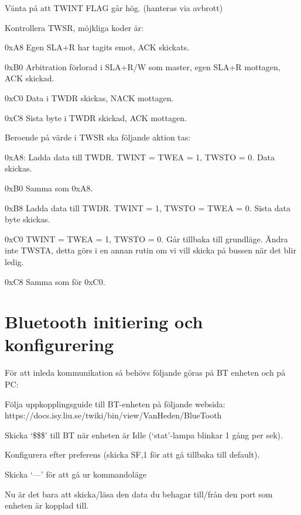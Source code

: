 \begin{packed_enumerate}
\item Vänta på att TWINT FLAG går hög. (hanteras via avbrott)
\item Kontrollera TWSR, möjkliga koder är:
\begin{packed_enumerate}
\item 0xA8 Egen SLA+R har tagits emot, ACK skickats.
\item 0xB0 Arbitration förlorad i SLA+R/W som master, egen SLA+R mottagen, ACK skickad.
\item 0xC0 Data i TWDR skickas, NACK mottagen.
\item 0xC8 Sista byte i TWDR skickad, ACK mottagen.
\end{packed_enumerate}
\item Beroende på värde i TWSR ska följande aktion tas:
\begin{packed_enumerate}
\item 0xA8: Ladda data till TWDR. TWINT = TWEA = 1, TWSTO = 0. Data skickas.
\item 0xB0 Samma som 0xA8.
\item 0xB8 Ladda data till TWDR. TWINT = 1, TWSTO = TWEA = 0. Sista data byte skickas.
\item 0xC0 TWINT = TWEA = 1, TWSTO = 0. Går tillbaka till grundläge. Ändra inte TWSTA, detta görs i en annan rutin om vi vill skicka på bussen när det blir ledig.
\item 0xC8 Samma som för 0xC0.
\end{packed_enumerate}
\end{packed_enumerate}


\section{Bluetooth initiering och konfigurering}
\label{Bluetoothinit}

För att inleda kommunikation så behövs följande göras på BT enheten och på PC:

\begin{packed_enumerate}
\item Följa uppkopplingsguide till BT-enheten på följande websida: \\ https://docs.isy.liu.se/twiki/bin/view/VanHeden/BlueTooth
\item Skicka ‘\$\$\$’ till BT när enheten är Idle (‘stat’-lampa blinkar 1 gång per sek).
\item Konfigurera efter preferens (skicka SF,1 för att gå tillbaka till default).
\item Skicka ‘---’ för att gå ur kommandoläge
\item Nu är det bara att skicka/läsa den data du behagar till/från den port som enheten är kopplad till.
\end{packed_enumerate}

